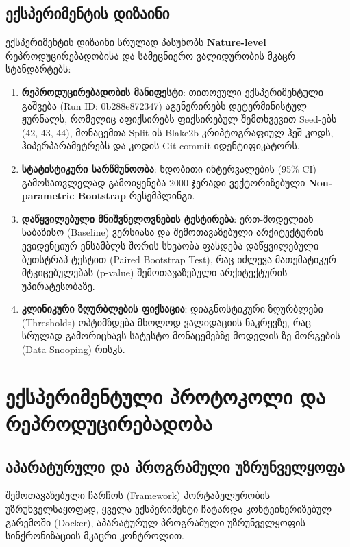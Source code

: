 \documentclass[12pt,a4paper,oneside]{report}
\begin{document}
\section{ექსპერიმენტის დიზაინი}
ექსპერიმენტის დიზაინი სრულად პასუხობს \textbf{Nature-level} რეპროდუცირებადობისა და სამეცნიერო ვალიდურობის მკაცრ სტანდარტებს:
\begin{enumerate}[leftmargin=1.6em]
    \item \textbf{რეპროდუცირებადობის მანიფესტი}: თითოეული ექსპერიმენტული გაშვება (Run ID: 0b288e872347) აგენერირებს დეტერმინისტულ ჟურნალს, რომელიც აფიქსირებს ფიქსირებულ შემთხვევით Seed-ებს (42, 43, 44), მონაცემთა Split-ის Blake2b კრიპტოგრაფიულ ჰეშ-კოდს, ჰიპერპარამეტრებს და კოდის Git-commit იდენტიფიკატორს.
    \item \textbf{სტატისტიკური სარწმუნოობა}: ნდობითი ინტერვალების (95\% CI) გამოსათვლელად გამოიყენება 2000-ჯერადი ვექტორიზებული \textbf{Non-parametric Bootstrap} რესემპლინგი.
    \item \textbf{დაწყვილებული მნიშვნელოვნების ტესტირება}: ერთ-მოდელიან საბაზისო (Baseline) ვერსიასა და შემოთავაზებული არქიტექტურის ევიდენციურ ენსამბლს შორის სხვაობა ფასდება დაწყვილებული ბუთსტრაპ ტესტით (Paired Bootstrap Test), რაც იძლევა მათემატიკურ მტკიცებულებას (p-value) შემოთავაზებული არქიტექტურის უპირატესობაზე.
    \item \textbf{კლინიკური ზღურბლების ფიქსაცია}: დიაგნოსტიკური ზღურბლები (Thresholds) ოპტიმზდება მხოლოდ ვალიდაციის ნაკრევზე, რაც სრულად გამორიცხავს სატესტო მონაცემებზე მოდელის ზე-მორგების (Data Snooping) რისკს.
\end{enumerate}

\chapter{ექსპერიმენტული პროტოკოლი და რეპროდუცირებადობა}

\section{აპარატურული და პროგრამული უზრუნველყოფა}
შემოთავაზებული ჩარჩოს (Framework) პორტაბელურობის უზრუნველსაყოფად, ყველა ექსპერიმენტი ჩატარდა კონტეინერიზებულ გარემოში (Docker), აპარატურულ-პროგრამული უზრუნველყოფის სინქრონიზაციის მკაცრი კონტროლით.
\end{document}

